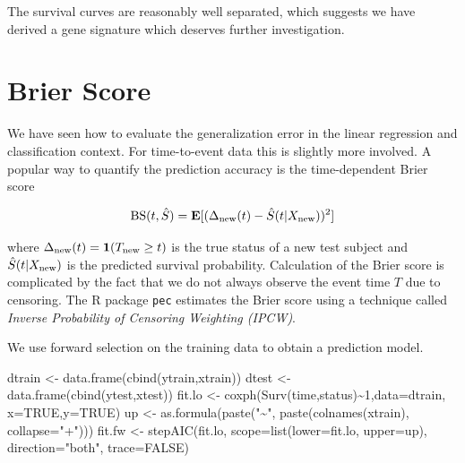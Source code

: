 \documentclass[
]{book}
\newenvironment{Shaded}{\begin{snugshade}}{\end{snugshade}}
\newcommand{\AttributeTok}[1]{\textcolor[rgb]{0.77,0.63,0.00}{#1}}
\newcommand{\ConstantTok}[1]{\textcolor[rgb]{0.00,0.00,0.00}{#1}}
\newcommand{\DecValTok}[1]{\textcolor[rgb]{0.00,0.00,0.81}{#1}}
\newcommand{\FunctionTok}[1]{\textcolor[rgb]{0.00,0.00,0.00}{#1}}
\newcommand{\NormalTok}[1]{#1}
\newcommand{\OtherTok}[1]{\textcolor[rgb]{0.56,0.35,0.01}{#1}}
\newcommand{\SpecialCharTok}[1]{\textcolor[rgb]{0.00,0.00,0.00}{#1}}
\newcommand{\StringTok}[1]{\textcolor[rgb]{0.31,0.60,0.02}{#1}}
\begin{document}
The survival curves are reasonably well separated, which suggests we have derived a gene signature which deserves further investigation.

\hypertarget{brier-score}{%
\section{Brier Score}\label{brier-score}}

We have seen how to evaluate the generalization error in the linear regression and classification context. For time-to-event data this is slightly more involved. A popular way to quantify the prediction accuracy is the time-dependent Brier score

\[{\rm BS}(t,\hat{S})={\bf E}[(\Delta_{\rm{new}}(t)-\hat{S}(t|X_{\rm new}))^2] \]

where \(\Delta_{\textrm{new}}(t)={\bf 1}(T_{\textrm{new}}\geq t)\) is the true status of a new test subject and
\(\hat{S}(t|X_{\rm new})\) is the predicted survival probability. Calculation of the Brier score is complicated by the fact that we do not always observe the event time \(T\) due to censoring. The R package \texttt{pec} estimates the Brier score using a technique called \emph{Inverse Probability of Censoring Weighting (IPCW)}.

We use forward selection on the training data to obtain a prediction model.

\begin{Shaded}
\begin{Highlighting}[]
\NormalTok{dtrain }\OtherTok{\textless{}{-}} \FunctionTok{data.frame}\NormalTok{(}\FunctionTok{cbind}\NormalTok{(ytrain,xtrain))}
\NormalTok{dtest }\OtherTok{\textless{}{-}} \FunctionTok{data.frame}\NormalTok{(}\FunctionTok{cbind}\NormalTok{(ytest,xtest))}
\NormalTok{fit.lo }\OtherTok{\textless{}{-}} \FunctionTok{coxph}\NormalTok{(}\FunctionTok{Surv}\NormalTok{(time,status)}\SpecialCharTok{\textasciitilde{}}\DecValTok{1}\NormalTok{,}\AttributeTok{data=}\NormalTok{dtrain,}
              \AttributeTok{x=}\ConstantTok{TRUE}\NormalTok{,}\AttributeTok{y=}\ConstantTok{TRUE}\NormalTok{)}
\NormalTok{up }\OtherTok{\textless{}{-}} \FunctionTok{as.formula}\NormalTok{(}\FunctionTok{paste}\NormalTok{(}\StringTok{"\textasciitilde{}"}\NormalTok{, }
                       \FunctionTok{paste}\NormalTok{(}\FunctionTok{colnames}\NormalTok{(xtrain), }
                             \AttributeTok{collapse=}\StringTok{"+"}\NormalTok{)))}
\NormalTok{fit.fw }\OtherTok{\textless{}{-}} \FunctionTok{stepAIC}\NormalTok{(fit.lo,}
                  \AttributeTok{scope=}\FunctionTok{list}\NormalTok{(}\AttributeTok{lower=}\NormalTok{fit.lo,}
                             \AttributeTok{upper=}\NormalTok{up),}
                  \AttributeTok{direction=}\StringTok{"both"}\NormalTok{,}
                  \AttributeTok{trace=}\ConstantTok{FALSE}\NormalTok{)}
\end{Highlighting}
\end{Shaded}
\end{document}

